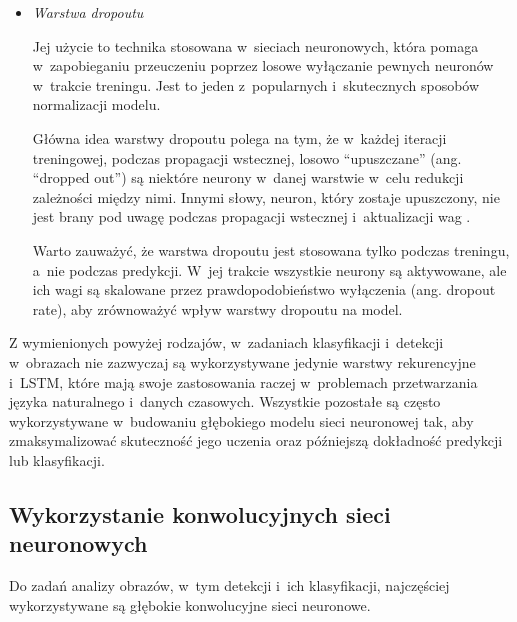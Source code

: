{\begin{itemize}
        Najczęściej pojawia się bezpośrednio po warstwie konwolucyjnej, gdzie pomaga w~redukcji liczby parametrów oraz obliczeń, co z~kolei przyspiesza uczenie się i~obliczenia w~sieci.
        Takie zmniejszenie wymiarowości możne być wykonywane na przykład poprzez wybieranie największej wartości z~określonego obszaru, jak robią to warstwy \emph{max-pooling}, lub poprzez uśrednianie wartości z~określonego obszaru, jak robią to warstwy \emph{average-pooling}.

  \item \emph{Warstwa dropoutu}

        Jej użycie to technika stosowana w~sieciach neuronowych, która pomaga w~zapobieganiu przeuczeniu poprzez losowe wyłączanie pewnych neuronów w~trakcie treningu.
        Jest to jeden z~popularnych i~skutecznych sposobów normalizacji modelu.

        Główna idea warstwy dropoutu polega na tym, że w~każdej iteracji treningowej, podczas propagacji wstecznej, losowo ``upuszczane'' (ang. ``dropped out'') są niektóre neurony w~danej warstwie w~celu redukcji zależności między nimi.
        Innymi słowy, neuron, który zostaje upuszczony, nie jest brany pod uwagę podczas propagacji wstecznej i~aktualizacji wag \cite{srivastava2014dropout}.

        Warto zauważyć, że warstwa dropoutu jest stosowana tylko podczas treningu, a~nie podczas predykcji.
        W~jej trakcie wszystkie neurony są aktywowane, ale ich wagi są skalowane przez prawdopodobieństwo wyłączenia (ang. dropout rate), aby zrównoważyć wpływ warstwy dropoutu na model.

\end{itemize}

Z wymienionych powyżej rodzajów, w~zadaniach klasyfikacji i~detekcji w~obrazach nie zazwyczaj są wykorzystywane jedynie warstwy rekurencyjne i~LSTM, które mają swoje zastosowania raczej w~problemach przetwarzania języka naturalnego i~danych czasowych.
Wszystkie pozostałe są często wykorzystywane w~budowaniu głębokiego modelu sieci neuronowej tak, aby zmaksymalizować skuteczność jego uczenia oraz późniejszą dokładność predykcji lub klasyfikacji.

\subsection{Wykorzystanie konwolucyjnych sieci neuronowych}

Do zadań analizy obrazów, w~tym detekcji i~ich klasyfikacji, najczęściej wykorzystywane są głębokie konwolucyjne sieci neuronowe.

}
